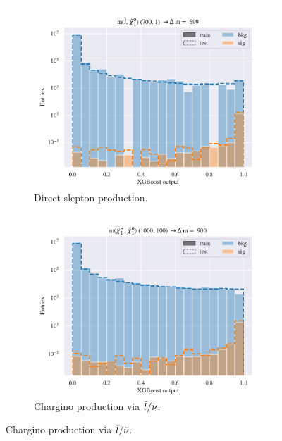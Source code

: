 \begin{figure}[H]
    \centering
    \begin{subfigure}[t!]{0.49\textwidth}
        \includegraphics[width = \textwidth]{Figures/SlepSlep/ML/BDT/High_level/High/scaled_train_test_396033.pdf}
        \caption{Direct slepton production.}
        \label{fig:}
    \end{subfigure}
    \begin{subfigure}[t!]{0.49\textwidth}
        \includegraphics[width = \textwidth]{Figures/SlepSnu/BDT/High_level/High/scaled_train_test_397169.pdf}
        \caption{Chargino production via $\Tilde{l}/\Tilde{\nu}$.}
        \label{fig:}
    \end{subfigure}

\end{figure}
